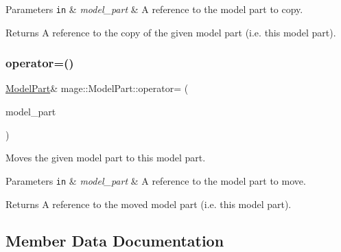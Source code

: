\begin{DoxyParams}[1]{Parameters}
\mbox{\tt in}  & {\em model\+\_\+part} & A reference to the model part to copy. \\
\hline
\end{DoxyParams}
\begin{DoxyReturn}{Returns}
A reference to the copy of the given model part (i.\+e. this model part). 
\end{DoxyReturn}
\hypertarget{structmage_1_1_model_part_a8337b8034d9a43514690a2db3d0f43c7}{}\label{structmage_1_1_model_part_a8337b8034d9a43514690a2db3d0f43c7} 
\subsubsection{\texorpdfstring{operator=()}{operator=()}\hspace{0.1cm}{\footnotesize\ttfamily [2/2]}}
{\footnotesize\ttfamily \hyperlink{structmage_1_1_model_part}{Model\+Part}\& mage\+::\+Model\+Part\+::operator= (\begin{DoxyParamCaption}\item[{\hyperlink{structmage_1_1_model_part}{Model\+Part} \&\&}]{model\+\_\+part }\end{DoxyParamCaption})\hspace{0.3cm}{\ttfamily [default]}}

Moves the given model part to this model part.


\begin{DoxyParams}[1]{Parameters}
\mbox{\tt in}  & {\em model\+\_\+part} & A reference to the model part to move. \\
\hline
\end{DoxyParams}
\begin{DoxyReturn}{Returns}
A reference to the moved model part (i.\+e. this model part). 
\end{DoxyReturn}


\subsection{Member Data Documentation}
\hypertarget{structmage_1_1_model_part_abac2e9942c2d8015dc8b4f363729dc45}{}\label{structmage_1_1_model_part_abac2e9942c2d8015dc8b4f363729dc45} 

